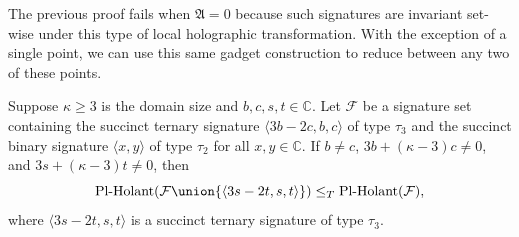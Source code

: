 \documentclass[11pt]{article}
\newcommand{\PlHolant}{\operatorname{Pl-Holant}}
\begin{document}
The previous proof fails when $\mathfrak{A} = 0$
because such signatures are invariant set-wise under this type of local holographic transformation.
With the exception of a single point,
we can use this same gadget construction to reduce between any two of these points.

\begin{lemma} \label{lem:ternary:normalize_preparation}
 Suppose $\kappa \ge 3$ is the domain size and $b,c,s,t \in \mathbb{C}$.
 Let $\mathcal{F}$ be a signature set containing the succinct ternary signature $\langle 3 b - 2 c, b, c \rangle$ of type $\tau_3$
 and the succinct binary signature $\langle x,y \rangle$ of type $\tau_2$ for all $x,y \in \mathbb{C}$.
 If $b \ne c$, $3 b + (\kappa - 3) c \ne 0$, and $3 s + (\kappa - 3) t \ne 0$,
 then
 \[
  \PlHolant(\mathcal{F} \union \{\langle 3 s - 2 t, s, t \rangle\}) \le_T \PlHolant(\mathcal{F}),
 \]
 where $\langle 3 s - 2 t, s, t \rangle$ is a succinct ternary signature of type $\tau_3$.
\end{lemma}
\end{document}
